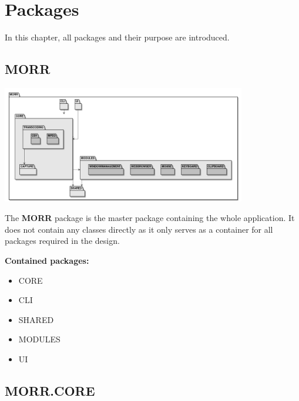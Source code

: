 \chapter{Packages}
\label{ch:package}
\newenvironment{packclass}[0]{\textbf{Contained classes:} \begin{itemize}
}{\end{itemize}}
\newenvironment{packenum}[0]{\textbf{Contained enums:} \begin{itemize}
}{\end{itemize}}
\newenvironment{packif}[0]{\textbf{Contained interfaces:} \begin{itemize}
}{\end{itemize}}
\newenvironment{packpack}[0]{\textbf{Contained packages:} \begin{itemize}
}{\end{itemize}}
\newcommand{\packobj}[1]{\item #1}
\newcommand{\abstract}[1]{\textit{abstract} #1}

In this chapter, all packages and their purpose are introduced.

\section{MORR}

\begin{center}
    \includegraphics[width=0.80\textwidth]{resources/Packages/AllPackages.png}
\end{center}

The \textbf{MORR} package is the master package containing the whole application. It does not contain any classes directly as it only serves as a container for all packages required in the design.

\begin{packpack}
\packobj{CORE}
\packobj{CLI}
\packobj{SHARED}
\packobj{MODULES}
\packobj{UI}
\end{packpack}

\newpage
\section{MORR.CORE}

